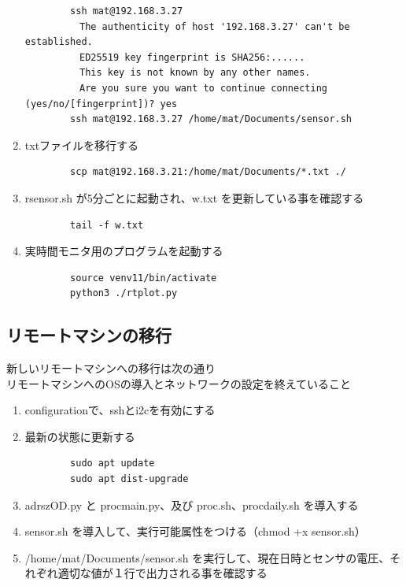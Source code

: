 \documentclass[12pt,a4paper,uplatex]{jsbook}
\begin{document}
\begin{enumerate}
	\begin{verbatim}
		ssh mat@192.168.3.27
		　The authenticity of host '192.168.3.27' can't be established.
		　ED25519 key fingerprint is SHA256:......
		　This key is not known by any other names.
		　Are you sure you want to continue connecting (yes/no/[fingerprint])? yes
		ssh mat@192.168.3.27 /home/mat/Documents/sensor.sh
	\end{verbatim}
	\item txtファイルを移行する
	\begin{verbatim}
		scp mat@192.168.3.21:/home/mat/Documents/*.txt ./
	\end{verbatim}
	\item rsensor.sh が5分ごとに起動され、w.txt を更新している事を確認する
	\begin{verbatim}
		tail -f w.txt
	\end{verbatim}
	\item 実時間モニタ用のプログラムを起動する
	\begin{verbatim}
		source venv11/bin/activate
		python3 ./rtplot.py
	\end{verbatim}
\end{enumerate}

\subsection{リモートマシンの移行}

新しいリモートマシンへの移行は次の通り\\リモートマシンへのOSの導入とネットワークの設定を終えていること

\begin{enumerate}
	\item configurationで、sshとi2cを有効にする
	\item 最新の状態に更新する
	\begin{verbatim}
		sudo apt update
		sudo apt dist-upgrade
	\end{verbatim}
	\item adrszOD.py と procmain.py、及び proc.sh、procdaily.sh を導入する
	\item sensor.sh を導入して、実行可能属性をつける（chmod +x sensor.sh）
	\item /home/mat/Documents/sensor.sh を実行して、現在日時とセンサの電圧、それぞれ適切な値が１行で出力される事を確認する
\end{enumerate}
\end{document}
